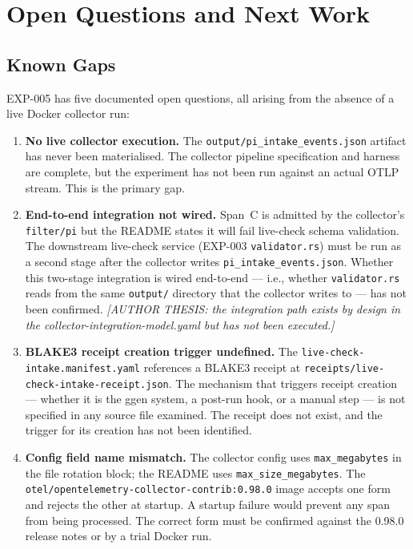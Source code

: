 \section{Open Questions and Next Work}
\label{sec:otel-weaver-exp-005-collector-to-intake-open-questions}

\subsection{Known Gaps}
\label{sec:otel-weaver-exp-005-collector-to-intake-open-questions-gaps}

EXP-005 has five documented open questions, all arising from the absence of a live Docker
collector run:

\begin{enumerate}
  \item \textbf{No live collector execution.} The \texttt{output/pi\_intake\_events.json}
        artifact has never been materialised. The collector pipeline specification and harness
        are complete, but the experiment has not been run against an actual OTLP stream. This
        is the primary gap.

  \item \textbf{End-to-end integration not wired.} Span~C is admitted by the collector's
        \texttt{filter/pi} but the README states it will fail live-check schema validation.
        The downstream live-check service (EXP-003 \texttt{validator.rs}) must be run as a
        second stage after the collector writes \texttt{pi\_intake\_events.json}. Whether
        this two-stage integration is wired end-to-end --- i.e., whether \texttt{validator.rs}
        reads from the same \texttt{output/} directory that the collector writes to --- has
        not been confirmed. \textit{[AUTHOR THESIS: the integration path exists by design in
        the collector-integration-model.yaml but has not been executed.]}

  \item \textbf{BLAKE3 receipt creation trigger undefined.} The
        \texttt{live-check-intake.manifest.yaml} references a BLAKE3 receipt at
        \texttt{receipts/live-check-intake-receipt.json}. The mechanism that triggers receipt
        creation --- whether it is the ggen system, a post-run hook, or a manual step --- is
        not specified in any source file examined. The receipt does not exist, and the trigger
        for its creation has not been identified.

  \item \textbf{Config field name mismatch.} The collector config uses \texttt{max\_megabytes}
        in the file rotation block; the README uses \texttt{max\_size\_megabytes}. The
        \texttt{otel/opentelemetry-collector-contrib:0.98.0} image accepts one form and
        rejects the other at startup. A startup failure would prevent any span from being
        processed. The correct form must be confirmed against the 0.98.0 release notes or by
        a trial Docker run.


\end{enumerate}

